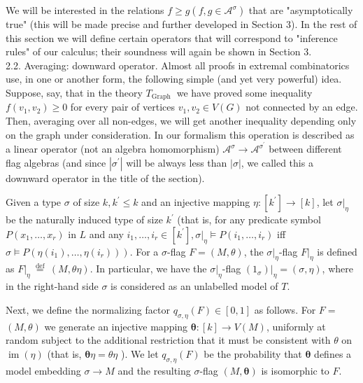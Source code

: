 \documentclass[10pt]{article}
\begin{document}
We will be interested in the relations $f \geq g\left(f, g \in \mathcal{A}^{\sigma}\right)$ that are "asymptotically true" (this will be made precise and further developed in Section 3). In the rest of this section we will define certain operators that will correspond to "inference rules" of our calculus; their soundness will again be shown in Section 3.\\
2.2. Averaging: downward operator. Almost all proofs in extremal combinatorics use, in one or another form, the following simple (and yet very powerful) idea. Suppose, say, that in the theory $T_{\text {Graph }}$ we have proved some inequality $f\left(v_{1}, v_{2}\right) \geq 0$ for every pair of vertices $v_{1}, v_{2} \in V(G)$ not connected by an edge. Then, averaging over all non-edges, we will get another inequality depending only on the graph under consideration. In our formalism this operation is described as a linear operator (not an algebra homomorphism) $\mathcal{A}^{\sigma} \longrightarrow \mathcal{A}^{\sigma^{\prime}}$ between different flag algebras (and since $\left|\sigma^{\prime}\right|$ will be always less than $|\sigma|$, we called this a downward operator in the title of the section).

Given a type $\sigma$ of size $k, k^{\prime} \leq k$ and an injective mapping $\eta:\left[k^{\prime}\right] \longrightarrow[k]$, let $\left.\sigma\right|_{\eta}$ be the naturally induced type of size $k^{\prime}$ (that is, for any predicate symbol $P\left(x_{1}, \ldots, x_{r}\right)$ in $L$ and any $i_{1}, \ldots, i_{r} \in\left[k^{\prime}\right],\left.\sigma\right|_{\eta} \models P\left(i_{1}, \ldots, i_{r}\right)$ iff $\left.\sigma \models P\left(\eta\left(i_{1}\right), \ldots, \eta\left(i_{r}\right)\right)\right)$. For a $\sigma$-flag $F=(M, \theta)$, the $\left.\sigma\right|_{\eta}$-flag $\left.F\right|_{\eta}$ is defined as $\left.F\right|_{\eta} \stackrel{\text { def }}{=}(M, \theta \eta)$. In particular, we have the $\left.\sigma\right|_{\eta}$-flag $\left.\left(1_{\sigma}\right)\right|_{\eta}=(\sigma, \eta)$, where in the right-hand side $\sigma$ is considered as an unlabelled model of $T$.

Next, we define the normalizing factor $q_{\sigma, \eta}(F) \in[0,1]$ as follows. For $F=$ $(M, \theta)$ we generate an injective mapping $\boldsymbol{\theta}:[k] \longrightarrow V(M)$, uniformly at random subject to the additional restriction that it must be consistent with $\theta$ on $\operatorname{im}(\eta)$ (that is, $\boldsymbol{\theta} \eta=\theta \eta$ ). We let $q_{\sigma, \eta}(F)$ be the probability that $\boldsymbol{\theta}$ defines a model embedding $\sigma \longrightarrow M$ and the resulting $\sigma$-flag $(M, \boldsymbol{\theta})$ is isomorphic to $F$.
\end{document}
